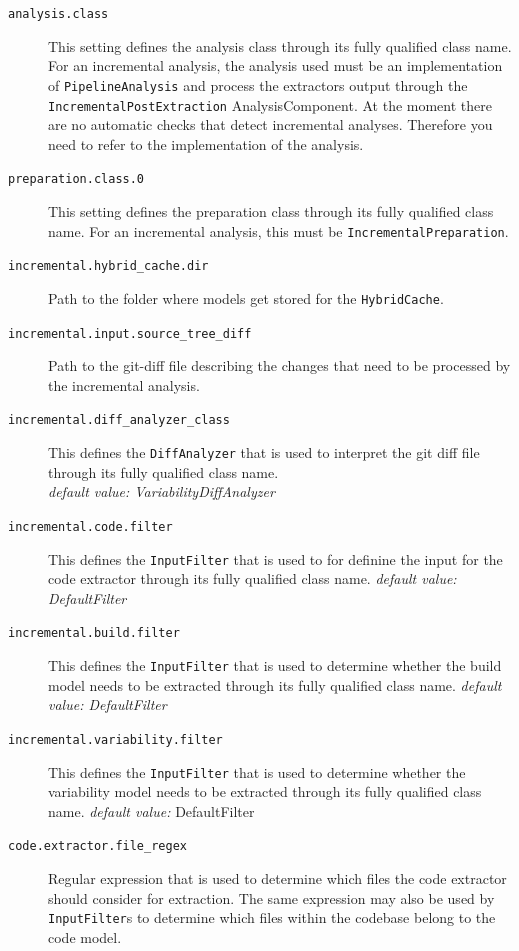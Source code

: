 \documentclass[a4paper]{article}
\begin{document}
\begin{description}
	\item[\texttt{analysis.class}] This setting defines the analysis class through its fully qualified class name. For an incremental analysis, the analysis used must be an implementation of \texttt{PipelineAnalysis} and process the extractors output through the \texttt{IncrementalPostExtraction} AnalysisComponent. At the moment there are no automatic checks that detect incremental analyses. Therefore you need to refer to the implementation of the analysis.
	\item[\texttt{preparation.class.0}] This setting defines the preparation class through its fully qualified class name. For an incremental analysis, this must be \texttt{IncrementalPreparation}. \\
	\item[\texttt{incremental.hybrid\_cache.dir}] Path to the folder where models get stored for the \texttt{HybridCache}.
	\item[\texttt{incremental.input.source\_tree\_diff}] Path to the git-diff file describing the changes that need to be processed by the incremental analysis.
	\item[\texttt{incremental.diff\_analyzer\_class}] This defines the \texttt{DiffAnalyzer} that is used to interpret the git diff file through its fully qualified class name. \\
	    \emph{default value: VariabilityDiffAnalyzer}
	\item[\texttt{incremental.code.filter}] This defines the \texttt{InputFilter} that is used to for definine the input for the code extractor through its fully qualified class name. 
	    \emph{default value: DefaultFilter}
	\item[\texttt{incremental.build.filter}] This defines the \texttt{InputFilter} that is used to determine whether the build model needs to be extracted through its fully qualified class name.
	    \emph{default value: DefaultFilter} 
	\item[\texttt{incremental.variability.filter}] This defines the \texttt{InputFilter} that is used to determine whether the variability model needs to be extracted through its fully qualified class name. 
	    \emph{default value:} DefaultFilter
	\item[\texttt{code.extractor.file\_regex}] Regular expression that is used to determine which files the code extractor should consider for extraction. The same expression may also be used by \texttt{InputFilter}s to determine which files within the codebase belong to the code model. \\

\end{description}
\end{document}
